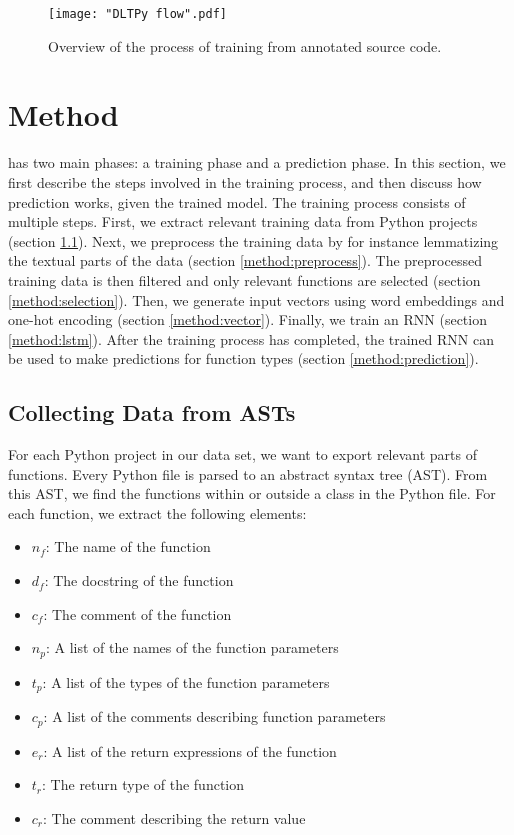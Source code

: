\begin{figure*}[h]
\centering
\texttt{[image: "DLTPy flow".pdf]}
\caption{Overview of the process of training from annotated source code.}
\label{figure:pipeline}
\end{figure*}

\section{Method} \label{method}
\dltpy{} has two main phases: a training phase and a prediction phase. In this section, we first describe the steps involved in the training process, and then discuss how prediction works, given the trained model. The training process consists of multiple steps. First, we extract relevant training data from Python projects (section \ref{method:extract}). Next, we preprocess the training data by for instance lemmatizing the textual parts of the data (section \ref{method:preprocess}). The preprocessed training data is then filtered and only relevant functions are selected (section \ref{method:selection}). Then, we generate input vectors using word embeddings and one-hot encoding (section \ref{method:vector}). Finally, we train an RNN (section \ref{method:lstm}). After the training process has completed, the trained RNN can be used to make predictions for function types (section \ref{method:prediction}). 

\subsection{Collecting Data from ASTs} \label{method:extract}
For each Python project in our data set, we want to export relevant parts of functions. Every Python file is parsed to an abstract syntax tree (AST). From this AST, we find the functions within or outside a class in the Python file. For each function, we extract the following elements:
\begin{itemize}
    \item $n_f$: The name of the function
    \item $d_f$: The docstring of the function
    \item $c_f$: The comment of the function
    \item $n_p$: A list of the names of the function parameters
    \item $t_p$: A list of the types of the function parameters
    \item $c_p$: A list of the comments describing function parameters
    \item $e_r$: A list of the return expressions of the function
    \item $t_r$: The return type of the function
    \item $c_r$: The comment describing the return value
\end{itemize}

